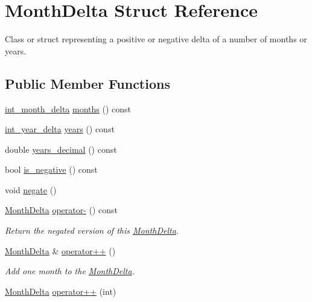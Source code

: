 \hypertarget{structMonthDelta}{\section{\-Month\-Delta \-Struct \-Reference}
\label{structMonthDelta}
}


\-Class or struct representing a positive or negative delta of a number of months or years.  


\subsection*{\-Public \-Member \-Functions}
\begin{DoxyCompactItemize}
\item 
\hyperlink{types_8h_adc711c00c117528b40875ad0119c687f}{int\-\_\-month\-\_\-delta} \hyperlink{structMonthDelta_a47f7592328f434f4091a5b044d83976a}{months} () const 
\item 
\hyperlink{types_8h_a39556f27d189e3da1fcb3db910239761}{int\-\_\-year\-\_\-delta} \hyperlink{structMonthDelta_abd1a36332a0347d39a9a7b7befceb6f5}{years} () const 
\item 
double \hyperlink{structMonthDelta_ae7ac38d813d15ea4b9db82a43ed1be89}{years\-\_\-decimal} () const 
\item 
bool \hyperlink{structMonthDelta_a4f0b4051d92cd180ac5f9f7466a36f57}{is\-\_\-negative} () const 
\item 
void \hyperlink{structMonthDelta_a88f17c6793e3e48ac00a70e12b9045d3}{negate} ()
\item 
\hyperlink{structMonthDelta}{\-Month\-Delta} \hyperlink{structMonthDelta_a5d754349cccfb68c729461b7a96d666f}{operator-\/} () const 
\begin{DoxyCompactList}\small\item\em \-Return the negated version of this \hyperlink{structMonthDelta}{\-Month\-Delta}. \end{DoxyCompactList}\item 
\hyperlink{structMonthDelta}{\-Month\-Delta} \& \hyperlink{structMonthDelta_a2d925db7f08eb18d1dcd4961d8149b48}{operator++} ()
\begin{DoxyCompactList}\small\item\em \-Add one month to the \hyperlink{structMonthDelta}{\-Month\-Delta}. \end{DoxyCompactList}\item 
\hyperlink{structMonthDelta}{\-Month\-Delta} \hyperlink{structMonthDelta_afcbef7f90cde7cf06a312da4acd5a1b9}{operator++} (int)

\end{DoxyCompactItemize}
